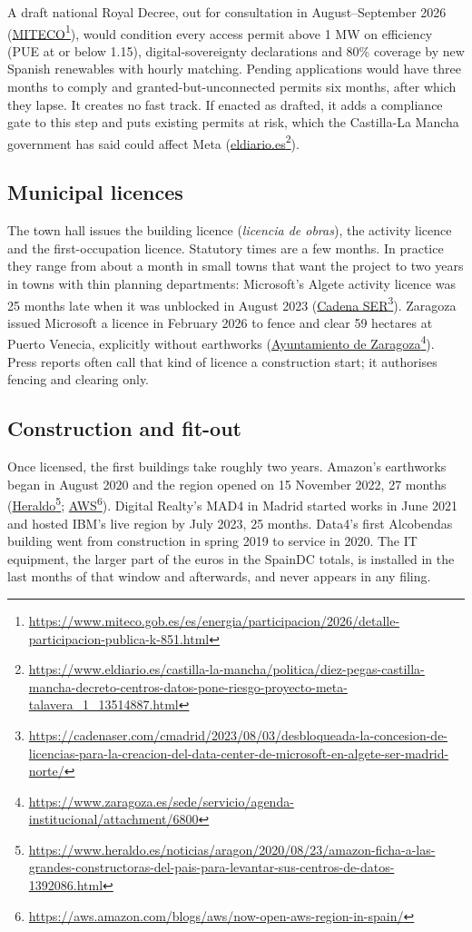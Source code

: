 \documentclass[11pt]{article}
\newcommand{\src}[2]{\href{#1}{#2}\footnote{\url{#1}}}
\begin{document}
A draft national Royal Decree, out for consultation in August--September 2026 (\src{https://www.miteco.gob.es/es/energia/participacion/2026/detalle-participacion-publica-k-851.html}{MITECO}), would condition every access permit above 1 MW on efficiency (PUE at or below 1.15), digital-sovereignty declarations and 80\% coverage by new Spanish renewables with hourly matching. Pending applications would have three months to comply and granted-but-unconnected permits six months, after which they lapse. It creates no fast track. If enacted as drafted, it adds a compliance gate to this step and puts existing permits at risk, which the Castilla-La Mancha government has said could affect Meta (\src{https://www.eldiario.es/castilla-la-mancha/politica/diez-pegas-castilla-mancha-decreto-centros-datos-pone-riesgo-proyecto-meta-talavera_1_13514887.html}{eldiario.es}).

\subsection{Municipal licences}

The town hall issues the building licence (\emph{licencia de obras}), the activity licence and the first-occupation licence. Statutory times are a few months. In practice they range from about a month in small towns that want the project to two years in towns with thin planning departments: Microsoft's Algete activity licence was 25 months late when it was unblocked in August 2023 (\src{https://cadenaser.com/cmadrid/2023/08/03/desbloqueada-la-concesion-de-licencias-para-la-creacion-del-data-center-de-microsoft-en-algete-ser-madrid-norte/}{Cadena SER}). Zaragoza issued Microsoft a licence in February 2026 to fence and clear 59 hectares at Puerto Venecia, explicitly without earthworks (\src{https://www.zaragoza.es/sede/servicio/agenda-institucional/attachment/6800}{Ayuntamiento de Zaragoza}). Press reports often call that kind of licence a construction start; it authorises fencing and clearing only.

\subsection{Construction and fit-out}

Once licensed, the first buildings take roughly two years. Amazon's earthworks began in August 2020 and the region opened on 15 November 2022, 27 months (\src{https://www.heraldo.es/noticias/aragon/2020/08/23/amazon-ficha-a-las-grandes-constructoras-del-pais-para-levantar-sus-centros-de-datos-1392086.html}{Heraldo}; \src{https://aws.amazon.com/blogs/aws/now-open-aws-region-in-spain/}{AWS}). Digital Realty's MAD4 in Madrid started works in June 2021 and hosted IBM's live region by July 2023, 25 months. Data4's first Alcobendas building went from construction in spring 2019 to service in 2020. The IT equipment, the larger part of the euros in the SpainDC totals, is installed in the last months of that window and afterwards, and never appears in any filing.
\end{document}
